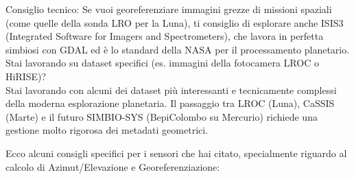 \documentclass[a4paper,14pt]{article}
\begin{document}
\begin{enumerate}
Consiglio tecnico: Se vuoi georeferenziare immagini grezze di missioni spaziali (come quelle della sonda LRO per la Luna), ti consiglio di esplorare anche ISIS3 (Integrated Software for Imagers and Spectrometers), che lavora in perfetta simbiosi con GDAL ed è lo standard della NASA per il processamento planetario.\\
Stai lavorando su dataset specifici (es. immagini della fotocamera LROC o HiRISE)?\\
Stai lavorando con alcuni dei dataset più interessanti e tecnicamente complessi della moderna esplorazione planetaria.
Il passaggio tra LROC (Luna), CaSSIS (Marte) e il futuro SIMBIO-SYS (BepiColombo su Mercurio) richiede una gestione molto rigorosa dei metadati geometrici.
\end{enumerate}
Ecco alcuni consigli specifici per i sensori che hai citato, specialmente riguardo al calcolo di Azimut/Elevazione e Georeferenziazione:\\
\end{document}

